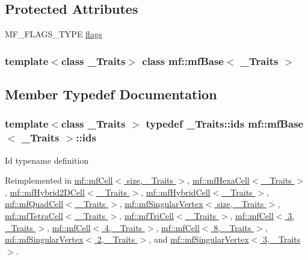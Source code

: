 \subsection*{Protected Attributes}
\begin{DoxyCompactItemize}
\item 
MF\_\-FLAGS\_\-TYPE \hyperlink{classmf_1_1mfBase_a3551780d0be3b33270adbb3726d6e2d9}{flags}
\end{DoxyCompactItemize}
\subsubsection*{template$<$class \_\-Traits$>$ class mf::mfBase$<$ \_\-Traits $>$}



\subsection{Member Typedef Documentation}
\hypertarget{classmf_1_1mfBase_a3b23f16ddf59da0a91ab12cf57c1f111}{
\subsubsection[{ids}]{\setlength{\rightskip}{0pt plus 5cm}template$<$class \_\-Traits $>$ typedef \_\-Traits::ids {\bf mf::mfBase}$<$ \_\-Traits $>$::{\bf ids}}}
\label{classmf_1_1mfBase_a3b23f16ddf59da0a91ab12cf57c1f111}
Id typename definition 

Reimplemented in \hyperlink{classmf_1_1mfCell_a9e32102899fb1e6b5e95b08a6c71063f}{mf::mfCell$<$ size, \_\-Traits $>$}, \hyperlink{classmf_1_1mfHexaCell_a0f1d3a8aa5b31635f48c2d1baa1a9f37}{mf::mfHexaCell$<$ \_\-Traits $>$}, \hyperlink{classmf_1_1mfHybrid2DCell_a0ee11399531818ab7eac9c5fede19b14}{mf::mfHybrid2DCell$<$ \_\-Traits $>$}, \hyperlink{classmf_1_1mfHybridCell_afcc1603f9fd31f5e82fc0f2175aa74d2}{mf::mfHybridCell$<$ \_\-Traits $>$}, \hyperlink{classmf_1_1mfQuadCell_a443cbcdcefb50bddded8078d38869040}{mf::mfQuadCell$<$ \_\-Traits $>$}, \hyperlink{classmf_1_1mfSingularVertex_ad951601375961980e2ad033de57e14a1}{mf::mfSingularVertex$<$ size, \_\-Traits $>$}, \hyperlink{classmf_1_1mfTetraCell_a1fe27f9bfd856ec3464b2b671ceaf558}{mf::mfTetraCell$<$ \_\-Traits $>$}, \hyperlink{classmf_1_1mfTriCell_ae8b5f3ec0b85289a7f8b39e1869458e4}{mf::mfTriCell$<$ \_\-Traits $>$}, \hyperlink{classmf_1_1mfCell_a9e32102899fb1e6b5e95b08a6c71063f}{mf::mfCell$<$ 3, \_\-Traits $>$}, \hyperlink{classmf_1_1mfCell_a9e32102899fb1e6b5e95b08a6c71063f}{mf::mfCell$<$ 4, \_\-Traits $>$}, \hyperlink{classmf_1_1mfCell_a9e32102899fb1e6b5e95b08a6c71063f}{mf::mfCell$<$ 8, \_\-Traits $>$}, \hyperlink{classmf_1_1mfSingularVertex_ad951601375961980e2ad033de57e14a1}{mf::mfSingularVertex$<$ 2, \_\-Traits $>$}, and \hyperlink{classmf_1_1mfSingularVertex_ad951601375961980e2ad033de57e14a1}{mf::mfSingularVertex$<$ 3, \_\-Traits $>$}.



